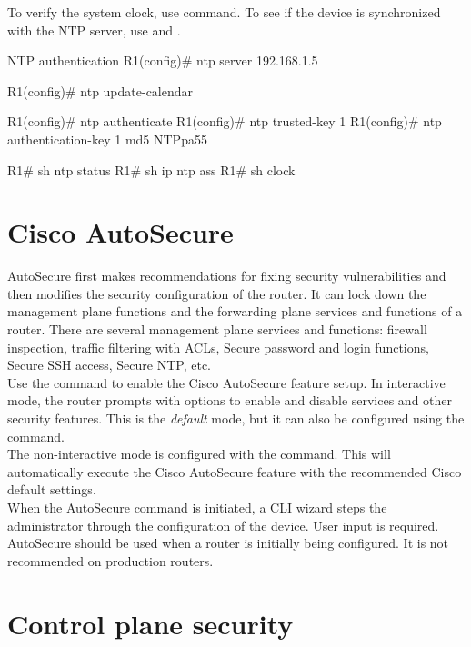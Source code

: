 To verify the system clock, use  command. To see if the device is synchronized with the NTP server, use  and .

\begin{sexylisting}{NTP authentication}
R1(config)# ntp server 192.168.1.5

R1(config)# ntp update-calendar

R1(config)# ntp authenticate
R1(config)# ntp trusted-key 1
R1(config)# ntp authentication-key 1 md5 NTPpa55

R1# sh ntp status
R1# sh ip ntp ass
R1# sh clock
\end{sexylisting}

\section{Cisco AutoSecure}

AutoSecure first makes recommendations for fixing security vulnerabilities and then modifies the security configuration of the router. It can lock down the management plane functions and the forwarding plane services and functions of a router. There are several management plane services and functions: firewall inspection, traffic filtering with ACLs, Secure password and login functions, Secure SSH access, Secure NTP, etc.\\

Use the  command to enable the Cisco AutoSecure feature setup. In interactive mode, the router prompts with options to enable and disable services and other security features. This is the \emph{default} mode, but it can also be configured using the  command.\\

The non-interactive mode is configured with the  command. This will automatically execute the Cisco AutoSecure feature with the recommended Cisco default settings. \\

When the AutoSecure command is initiated, a CLI wizard steps the administrator through the configuration of the device. User input is required. AutoSecure should be used when a router is initially being configured. It is not recommended on production routers.

\section{Control plane security}

